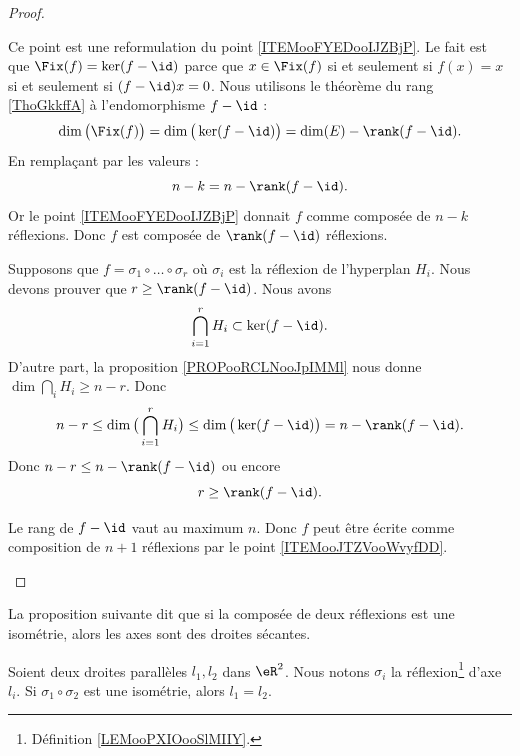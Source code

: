\begin{proof}
\begin{subproof}
		Ce point est une reformulation du point \ref{ITEMooFYEDooIJZBjP}. Le fait est que \( \Fix(f)=\ker(f-\id)\) parce que \( x\in\Fix(f)\) si et seulement si \( f(x)=x\) si et seulement si \( (f-\id)x=0\). Nous utilisons le théorème du rang \ref{ThoGkkffA} à l'endomorphisme \( f-\id\) :
		\begin{equation}
			\dim\big( \Fix(f) \big)=\dim\big( \ker(f-\id) \big)=\dim(E)-\rank(f-\id).
		\end{equation}
		En remplaçant par les valeurs :
		\begin{equation}
			n-k=n-\rank(f-\id).
		\end{equation}
		Or le point \ref{ITEMooFYEDooIJZBjP} donnait \( f\) comme composée de \( n-k\) réflexions. Donc \( f\) est composée de \( \rank(f-\id)\) réflexions.

		Supposons que \( f=\sigma_1\circ\ldots \circ \sigma_r\) où \( \sigma_i\) est la réflexion de l'hyperplan \( H_i\). Nous devons prouver que \( r\geq \rank(f-\id)\). Nous avons
		\begin{equation}
			\bigcap_{i=1}^rH_i\subset \ker(f-\id).
		\end{equation}
		D'autre part, la proposition \ref{PROPooRCLNooJpIMMl} nous donne \( \dim\bigcap_iH_i\geq n-r\). Donc
		\begin{equation}
			n-r\leq \dim\big( \bigcap_{i=1}^r H_i\big)\leq\dim\big( \ker(f-\id) \big)=n-\rank(f-\id).
		\end{equation}
		Donc \( n-r\leq n-\rank(f-\id)\) ou encore
		\begin{equation}
			r\geq \rank(f-\id).
		\end{equation}

		Le rang de \( f-\id\) vaut au maximum \( n\). Donc \( f\) peut être écrite comme composition de \( n+1\) réflexions par le point \ref{ITEMooJTZVooWvyfDD}.
	\end{subproof}
\end{proof}

La proposition suivante dit que si la composée de deux réflexions est une isométrie, alors les axes sont des droites sécantes.
\begin{proposition}	\label{PROPooXMPPooJbuJiw}
	Soient deux droites parallèles \( l_1,l_2\) dans \( \eR^2\). Nous notons \( \sigma_i\) la réflexion\footnote{Définition \ref{LEMooPXIOooSlMIIY}.} d'axe \( l_i\). Si \( \sigma_1\circ\sigma_2\) est une isométrie, alors \( l_1=l_2\).
\end{proposition}

